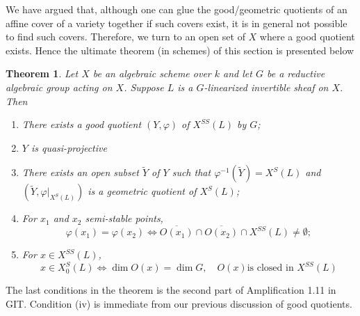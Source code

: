 \documentclass[12pt]{article}
\newtheorem{theorem}{Theorem}[section]
\theoremstyle{remark}
\theoremstyle{definition}
\begin{document}
    We have argued that, although one can glue the good/geometric quotients of an affine cover of a variety together if such covers exist, it is in general not possible to find such covers. Therefore, we turn to an open set of $X$ where a good quotient exists. Hence the ultimate theorem (in schemes) of this section is presented below
    \begin{theorem}
        Let $X$ be an algebraic scheme over $k$ and let $G$ be a reductive algebraic group acting on $X$. Suppose $L$ is a $G$-linearized invertible sheaf on $X$. Then
        \begin{enumerate}[\normalfont(i)]
            \item There exists a good quotient $(Y,\varphi)$ of $X^{SS}(L)$ by $G$;
            \item $Y$ is quasi-projective
            \item There exists an open subset $\tilde{Y}$ of $Y$ such that $\varphi^{-1}(\tilde Y)=X^S(L)$ and $(\tilde Y, \varphi|_{X^S(L)})$ is a geometric quotient of $X^S(L)$;
            \item For $x_1$ and $x_2$ semi-stable points,
                \[\varphi(x_1)=\varphi(x_2)\iff\overline{O(x_1)}\cap\overline{O(x_2)}\cap X^{SS}(L)\neq\emptyset;\]
            \item For $x\in X^{SS}(L)$,
                \[x\in X^S_0(L)\iff\dim O(x)=\dim G,\quad O(x)\text{is closed in }X^{SS}(L)\] 
        \end{enumerate}
    \end{theorem}
    The last conditions in the theorem is the second part of Amplification 1.11 in GIT. Condition (iv) is immediate from our previous discussion of good quotients.
\end{document}

